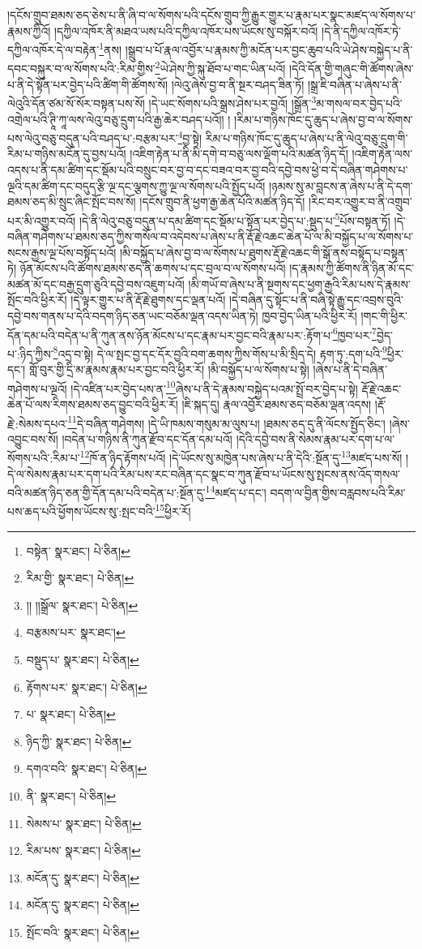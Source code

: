 །དངོས་གྲུབ་ཐམས་ཅད་ཅེས་པ་ནི་ཞི་བ་ལ་སོགས་པའི་དངོས་གྲུབ་ཀྱི་རྒྱུར་གྱུར་པ་རྣམ་པར་སྣང་མཛད་ལ་སོགས་པ་རྣམས་ཀྱིའོ། །དཀྱིལ་འཁོར་ནི་མཐའ་ཡས་པའི་དཀྱིལ་འཁོར་པས་ཡོངས་སུ་བསྐོར་བའོ། །དེ་ནི་དཀྱིལ་འཁོར་ཏེ་དཀྱིལ་འཁོར་དེ་ལ་བརྟེན་\footnote{བསྟེན་  སྣར་ཐང་།  པེ་ཅིན། }ནས། །སྒྲུབ་པ་པོ་རྣལ་འབྱོར་པ་རྣམས་ཀྱི་མངོན་པར་བྱང་ཆུབ་པའི་ཡེ་ཤེས་བསྐྱེད་པ་ནི་དབང་བསྐུར་བ་ལ་སོགས་པའི་:རིམ་གྱིས་\footnote{རིམ་གྱི་  སྣར་ཐང་།  པེ་ཅིན། }ཡེ་ཤེས་ཀྱི་སྐུ་ཐོབ་པ་གང་ཡིན་པའོ། །དེའི་དོན་གྱི་གཞུང་གི་ཚོགས་ཞེས་པ་ནི་དེ་སྟོན་པར་བྱེད་པའི་ཚིག་གི་ཚོགས་སོ། །ལེའུ་ཞེས་བྱ་བ་ནི་སྔར་བཤད་ཟིན་ཏོ། །སྒྲ་ཇི་བཞིན་པ་ཞེས་པ་ནི་ལེའུའི་དོན་ཙམ་སོ་སོར་བསྟན་པས་སོ། །དེ་ཡང་སོགས་པའི་སྒྲས་ཤེས་པར་བྱའོ། །སྒྲོན་\footnote{།། །།སྒྲོལ་  སྣར་ཐང་།  པེ་ཅིན། }མ་གསལ་བར་བྱེད་པའི་འགྲེལ་པའི་ཊཱི་ཀཱ་ལས་ལེའུ་བཅུ་དྲུག་པའི་རྒྱ་ཆེར་བཤད་པའོ།། །
།རིམ་པ་གཉིས་ཁོང་དུ་ཆུད་པ་ཞེས་བྱ་བ་ལ་སོགས་པས་ལེའུ་བཅུ་བདུན་པའི་བཤད་པ་:བརྩམ་པར་\footnote{བརྩམས་པར་  སྣར་ཐང་། }བྱ་སྟེ། རིམ་པ་གཉིས་ཁོང་དུ་ཆུད་པ་ཞེས་པ་ནི་ལེའུ་བཅུ་དྲུག་གི་རིམ་པ་གཉིས་མངོན་དུ་བྱས་པའོ། །འཇིག་རྟེན་པ་ནི་མི་དགེ་བ་བཅུ་ལས་ལྡོག་པའི་མཚན་ཉིད་དོ། །འཇིག་རྟེན་ལས་འདས་པ་ནི་དམ་ཚིག་དང་སྡོམ་པའི་བསྲུང་བར་བྱ་བ་དང་བཟའ་བར་བྱ་བའི་དབྱེ་བས་ཕྱེ་བ་དེ་བཞིན་གཤེགས་པ་ལྔའི་དམ་ཚིག་དང་བདུད་རྩི་ལྔ་དང་ལྕགས་ཀྱུ་ལྔ་ལ་སོགས་པའི་སྤྱོད་པའོ། །ཉམས་སུ་མ་བླངས་ན་ཞེས་པ་ནི་དེ་དག་ཐམས་ཅད་མི་སྲུང་ཞིང་སྤོང་བས་སོ། །དངོས་གྲུབ་ནི་ཕྱག་རྒྱ་ཆེན་པོའི་མཚན་ཉིད་དོ། །རིང་བར་འགྱུར་བ་ནི་འགྲུབ་པར་མི་འགྱུར་བའོ། །དེ་ནི་ལེའུ་བཅུ་བདུན་པ་དམ་ཚིག་དང་སྡོམ་པ་སྟོན་པར་བྱེད་པ་:སྡུད་པ་\footnote{བསྡུད་པ་  སྣར་ཐང་།  པེ་ཅིན། }པོས་བསྟན་ཏོ། །དེ་བཞིན་གཤེགས་པ་ཐམས་ཅད་ཀྱིས་གསོལ་བ་འདེབས་པ་ཞེས་པ་ནི་རྡོ་རྗེ་འཆང་ཆེན་པོ་ལ་མི་བསྐྱོད་པ་ལ་སོགས་པ་སངས་རྒྱས་ལྔ་པོས་བསྟོད་པའོ། །མི་བསྐྱོད་པ་ཞེས་བྱ་བ་ལ་སོགས་པ་ཐུགས་རྡོ་རྗེ་འཆང་གི་སྒོ་ནས་བསྟོད་པ་བསྟན་ཏེ། ཉོན་མོངས་པའི་ཚོགས་ཐམས་ཅད་ནི་ཆགས་པ་དང་བྲལ་བ་ལ་སོགས་པའོ། །ད་རྣམས་ཀྱི་ཚོགས་ནི་ཉིན་མོ་དང་མཚན་མོ་དང་བརྒྱ་དྲུག་ཅུའི་དབྱེ་བས་འཇུག་པའོ། །མི་གཡོ་བ་ཞེས་པ་ནི་སྔགས་དང་ཕྱག་རྒྱའི་རིམ་པས་དེ་རྣམས་སྤོང་བའི་ཕྱིར་རོ། །དེ་ལྟར་གྱུར་པ་ནི་རྡོ་རྗེ་ཐུགས་དང་ལྡན་པའོ། །དེ་བཞིན་དུ་སྟོང་པ་ནི་བཞི་སྟེ་རྒྱུ་དང་འབྲས་བུའི་དབྱེ་བས་གནས་པ་དེའི་བདག་ཉིད་ཅན་ཡང་བཅོམ་ལྡན་འདས་ཡིན་ཏེ། ཁྱབ་བྱེད་ཡིན་པའི་ཕྱིར་རོ། །གང་གི་ཕྱིར་དོན་དམ་པའི་བདེན་པ་ནི་ཀུན་ནས་ཉོན་མོངས་པ་དང་རྣམ་པར་བྱང་བའི་རྣམ་པར་:རྟོག་པ་\footnote{རྟོགས་པར་  སྣར་ཐང་།  པེ་ཅིན། }ཁྱབ་པར་\footnote{པ་  སྣར་ཐང་།  པེ་ཅིན། }བྱེད་པ་:ཉིད་ཀྱིས་\footnote{ཉིད་ཀྱི་  སྣར་ཐང་།  པེ་ཅིན། }འདྲ་བ་སྟེ། དེ་ལ་སྤང་བྱ་དང་དོར་བྱའི་བག་ཆགས་ཀྱིས་གོས་པ་མི་སྲིད་དེ། རྟག་ཏུ་:དག་པའི་\footnote{དགའ་བའི་  སྣར་ཐང་།  པེ་ཅིན། }ཕྱིར་དང་། གློ་བུར་གྱི་དྲི་མ་རྣམས་རྣམ་པར་བྱང་བའི་ཕྱིར་རོ། །མི་བསྐྱོད་པ་ལ་སོགས་པ་སྟེ། །ཞེས་པ་ནི་དེ་བཞིན་གཤེགས་པ་ལྔའོ། །དེ་འཛིན་པར་བྱེད་པས་ན་\footnote{ནི་  སྣར་ཐང་།  པེ་ཅིན། }ཞེས་པ་ནི་དེ་རྣམས་བསྐྱེད་པའམ་སྤྲོ་བར་བྱེད་པ་སྟེ། རྡོ་རྗེ་འཆང་ཆེན་པོ་ལས་རིགས་ཐམས་ཅད་བྱུང་བའི་ཕྱིར་རོ། །ཇི་སྐད་དུ། རྣལ་འབྱོར་ཐམས་ཅད་བཅོམ་ལྡན་འདས། །རྡོ་རྗེ་:སེམས་དཔའ་\footnote{སེམས་པ་  སྣར་ཐང་།  པེ་ཅིན། }དེ་བཞིན་གཤེགས། །དེ་ཡི་ཁམས་གསུམ་མ་ལུས་པ། །ཐམས་ཅད་དུ་ནི་ལོངས་སྤྱོད་ཅིང་། །ཞེས་འབྱུང་བས་སོ། །བདེན་པ་གཉིས་ནི་ཀུན་རྫོབ་དང་དོན་དམ་པའོ། །དེའི་དབྱེ་བས་ནི་སེམས་རྣམ་པར་དག་པ་ལ་སོགས་པའི་:རིམ་པ་\footnote{རིམ་པས་  སྣར་ཐང་།  པེ་ཅིན། }ཁོ་ན་ཉིད་རྟོགས་པའོ། །དེ་ཡོངས་སུ་མཁྱེན་པས་ཞེས་པ་ནི་དེའི་:སྔོན་དུ་\footnote{མངོན་དུ་  སྣར་ཐང་།  པེ་ཅིན། }མཛད་པས་སོ། །དེ་ལ་སེམས་རྣམ་པར་དག་པའི་རིམ་པས་རང་བཞིན་དང་སྣང་བ་ཀུན་རྫོབ་པ་ཡོངས་སུ་སྤངས་ནས་འོད་གསལ་བའི་མཚན་ཉིད་ཅན་གྱི་དོན་དམ་པའི་བདེན་པ་:སྔོན་དུ་\footnote{མངོན་དུ་  སྣར་ཐང་།  པེ་ཅིན། }མཛད་པ་དང་། བདག་ལ་བྱིན་གྱིས་བརླབས་པའི་རིམ་པས་ཆད་པའི་ཕྱོགས་ཡོངས་སུ་:སྤང་བའི་\footnote{སྤོང་བའི་  སྣར་ཐང་།  པེ་ཅིན། }ཕྱིར་རོ། 